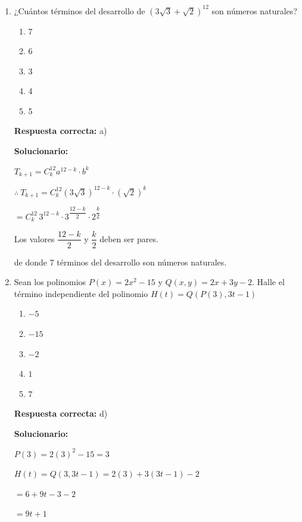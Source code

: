 \begin{enumerate}[resume]
	
	\item ¿Cuántos términos del desarrollo de $(3\sqrt{3}+\sqrt{2})^{12}$ son números naturales?
	\begin{enumerate}[label=\alph*)]
		\item 7
		\item 6
		\item 3
		\item 4
		\item 5
	\end{enumerate}
	\textbf{Respuesta correcta:} a)
	
	\vspace{2mm}
	\textbf{Solucionario:}
	
	$T_{k+1}=C_k^{12}a^{12-k}\cdot b^k$
	
	$\therefore\ T_{k+1}=C_k^{12}(3\sqrt{3})^{12-k}\cdot (\sqrt{2})^k$
	
	$=C_k^{12}\,3^{12-k}\cdot 3^{\dfrac{12-k}{2}}\cdot 2^{\dfrac{k}{2}}$
	
	Los valores $\dfrac{12-k}{2}$ y $\dfrac{k}{2}$ deben ser pares.
	
	
	de donde 7 términos del desarrollo son números naturales.
	
	\vspace{6mm}
	
	\item Sean los polinomios $P(x)=2x^2-15$ y $Q(x,y)=2x+3y-2$. Halle el término independiente del polinomio $H(t)=Q(P(3),3t-1)$
	\begin{enumerate}[label=\alph*)]
		\item $-5$
		\item $-15$
		\item $-2$
		\item $1$
		\item $7$
	\end{enumerate}
	\textbf{Respuesta correcta:} d)
	
	\vspace{2mm}
	\textbf{Solucionario:}
	
	$P(3)=2(3)^2-15=3$
	
	$H(t)=Q(3,3t-1)=2(3)+3(3t-1)-2$
	
	$=6+9t-3-2$
	
	$=9t+1$
	
	
	\vspace{6mm}
	

\end{enumerate}
